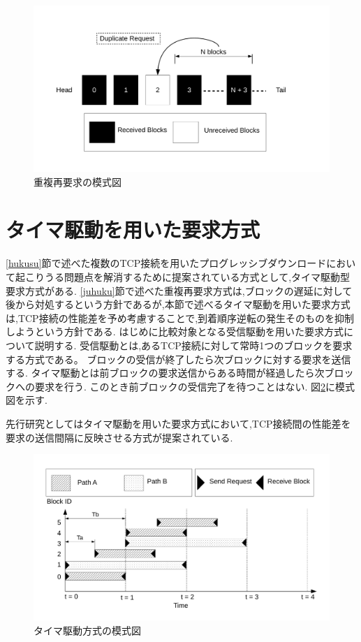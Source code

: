 \documentclass[a4j,12pt]{gradthesis_utf8}
\begin{document}
 \begin{figure}[ht]
     \centering
     \includegraphics[width=18cm]{figure/block_dup.pdf}
     \caption{重複再要求の模式図}
     \label{blockdup}
 \end{figure}

\newpage
 
 \section{タイマ駆動を用いた要求方式}
 \ref{hukusu}節で述べた複数のTCP接続を用いたプログレッシブダウンロードにおいて起こりうる問題点を解消するために提案されている方式として,タイマ駆動型要求方式がある.
 \ref{juhuku}節で述べた重複再要求方式は,ブロックの遅延に対して後から対処するという方針であるが,本節で述べるタイマ駆動を用いた要求方式は,TCP接続の性能差を予め考慮することで,到着順序逆転の発生そのものを抑制しようという方針である.
 はじめに比較対象となる受信駆動を用いた要求方式について説明する.
 受信駆動とは,あるTCP接続に対して常時1つのブロックを要求する方式である。
 ブロックの受信が終了したら次ブロックに対する要求を送信する.
 タイマ駆動とは前ブロックの要求送信からある時間が経過したら次ブロックへの要求を行う.
 このとき前ブロックの受信完了を待つことはない.
 図\ref{timer}に模式図を示す.
 
 先行研究としてはタイマ駆動を用いた要求方式において,TCP接続間の性能差を要求の送信間隔に反映させる方式が提案されている.
 
 \begin{figure}[ht]
 	\centering
 	\includegraphics[width=16.5cm]{figure/timer.pdf}
 	\caption{タイマ駆動方式の模式図}
	\label{timer}
 \end{figure}
 
\end{document}
